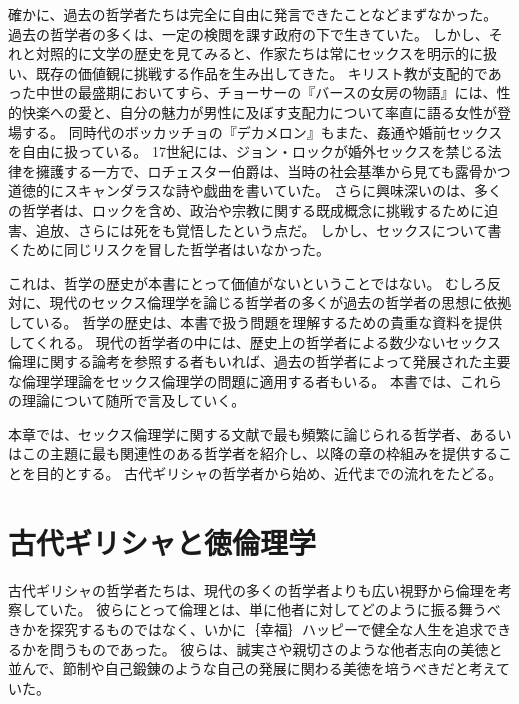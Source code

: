 \documentclass[paper=a4,book,openany]{jlreq}
\newcommand{\ig}[1]{}           %
\begin{document}
確かに、過去の哲学者たちは完全に自由に発言できたことなどまずなかった。
過去の哲学者の多くは、一定の検閲を課す政府の下で生きていた。
しかし、それと対照的に文学の歴史を見てみると、作家たちは常にセックスを明示的に扱い、既存の価値観に挑戦する作品を生み出してきた。
キリスト教が支配的であった中世の最盛期においてすら、チョーサーの『バースの女房の物語』には、性的快楽への愛と、自分の魅力が男性に及ぼす支配力について率直に語る女性が登場する。
同時代のボッカッチョの『デカメロン』もまた、姦通や婚前セックスを自由に扱っている。
17世紀には、ジョン・ロックが婚外セックスを禁じる法律を擁護する一方で、ロチェスター伯爵\ig{\footnote{2nd Earl of Rochester, 1647-1680、イングランドの貴族、宮廷詩人。
}}は、当時の社会基準から見ても露骨かつ道徳的にスキャンダラスな詩や戯曲を書いていた。
さらに興味深いのは、多くの哲学者は、ロックを含め、政治や宗教に関する既成概念に挑戦するために迫害、追放、さらには死をも覚悟したという点だ。
しかし、セックスについて書くために同じリスクを冒した哲学者はいなかった。

これは、哲学の歴史が本書にとって価値がないということではない。
むしろ反対に、現代のセックス倫理学を論じる哲学者の多くが過去の哲学者の思想に依拠している。
哲学の歴史は、本書で扱う問題を理解するための貴重な資料を提供してくれる。
現代の哲学者の中には、歴史上の哲学者による数少ないセックス倫理に関する論考を参照する者もいれば、過去の哲学者によって発展された主要な倫理学理論をセックス倫理学の問題に適用する者もいる。
本書では、これらの理論について随所で言及していく。

本章では、セックス倫理学に関する文献で最も頻繁に論じられる哲学者、あるいはこの主題に最も関連性のある哲学者を紹介し、以降の章の枠組みを提供することを目的とする。
古代ギリシャの哲学者から始め、近代までの流れをたどる。

\section{古代ギリシャと徳倫理学}

古代ギリシャの哲学者たちは、現代の多くの哲学者よりも広い視野から倫理を考察していた。
彼らにとって倫理とは、単に他者に対してどのように振る舞うべきかを探究するものではなく、いかに｛幸福｝{ハッピー}で健全な人生を追求できるかを問うものであった。
彼らは、誠実さや親切さのような他者志向の美徳と並んで、節制や自己鍛錬のような自己の発展に関わる美徳を培うべきだと考えていた。
\end{document}
